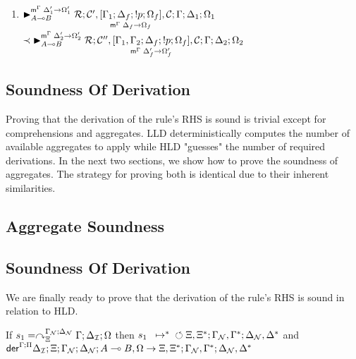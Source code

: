 \begin{enumerate}[leftmargin=*]
   \item $\matstate{A \lolli B}{\rulestk}{\lstack{C'},
      \pframe{\Gamma_1}{\Delta_f}{\bang p}{\Omega_f}{\Delta_f}{\Omega_f},
   \lstack{C}}{\Gamma}{\Delta_1}{\Omega_1}{\Delta'_1 \rightarrow \Omega'_1}$\\
   \hspace*{1cm} $\prec \matstate{A \lolli B}{\rulestk}{\lstack{C''},
      \pframe{\Gamma_1, \Gamma_2}{\Delta_f}{\bang p}{\Omega_f}{\Delta'_f}{\Omega'_f},
      \lstack{C}}{\Gamma}{\Delta_2}{\Omega_2}{\Delta'_2 \rightarrow \Omega'_2}$

\end{enumerate}

\subsection{Soundness Of Derivation}

Proving that the derivation of the rule's RHS is sound is trivial except
for comprehensions and aggregates. LLD deterministically computes the number of
available aggregates to apply while HLD "guesses" the number of required
derivations.  In the next two sections, we show how to prove the soundness of
aggregates. The strategy for proving both is identical due to their
inherent similarities.

\subsection{Aggregate Soundness}



\subsection{Soundness Of Derivation}

We are finally ready to prove that the derivation of the rule's RHS is sound in
relation to HLD.

\begin{lemma}\label{thm:head_derivation_soundness}
If $s_1 = \derstatex{\Gamma}{\deltan}{\Xi}{\gammanew}{\deltanew}{\Omega}$
then $\transs{s_1}{\finalstate{\Xi, \Xi^{*}}{\gammanew,
      \Gamma^{*}}{\deltanew, \Delta^{*}}}$ and\\
$\dz{\Gamma}{\Pi}{\deltan}{\Xi}{\gammanew}{\deltanew}{A \lolli B,
   \Omega}{\Xi, \Xi^{*}; \gammanew, \Gamma^{*}; \deltanew, \Delta^{*}}$
\end{lemma}

